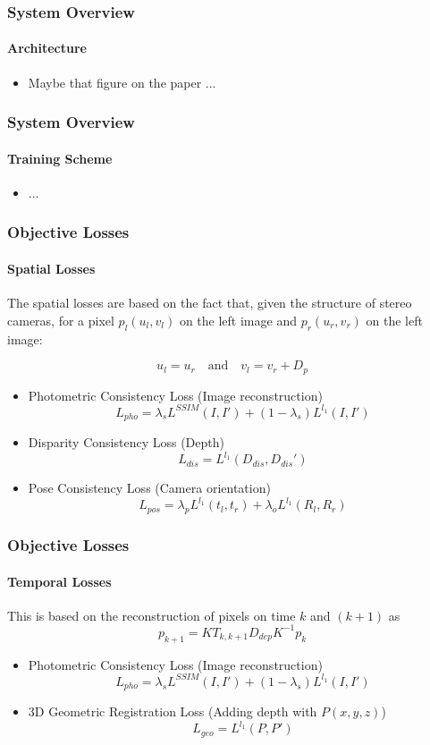 \documentclass{beamer}
\begin{document}
\begin{frame}
	\frametitle{System Overview}
    \framesubtitle{Architecture}
    \begin{itemize}
        \item Maybe that figure on the paper ...
    \end{itemize}
\end{frame}

\begin{frame}
	\frametitle{System Overview}
    \framesubtitle{Training Scheme}
    \begin{itemize}
        \item ...
    \end{itemize}
\end{frame}

\begin{frame}
	\frametitle{Objective Losses}
    \framesubtitle{Spatial Losses}
    The spatial losses are based on the fact that, given the structure of stereo cameras, for a pixel $p_l(u_l, v_l)$ on the left image and $p_r(u_r, v_r)$ on the left image:
    
    \[ u_l = u_r \hspace{1em} \text{and} \hspace{1em} v_l = v_r + D_p \] 
    \begin{itemize}
        \item Photometric Consistency Loss (Image reconstruction)
        \[ L_{pho} = \lambda_s L^{SSIM} (I, I') + (1 - \lambda_s)L^{l_1}(I, I') \]
        
        \item Disparity Consistency Loss (Depth)
        \[ L_{dis} = L^{l_1}(D_{dis}, D_{dis}') \]
        
        \item Pose Consistency Loss (Camera orientation)
        \[ L_{pos} = \lambda_pL^{l_1}(t_l, t_r) + \lambda_oL^{l_1}(R_l, R_r) \]
    \end{itemize}
\end{frame}

\begin{frame}
	\frametitle{Objective Losses}
    \framesubtitle{Temporal Losses}
    This is based on the reconstruction of pixels on time $k$ and $(k + 1)$ as
    \[p_{k + 1} = K T_{k, k+1} D_{dep} K^{-1} p_k \]
    \begin{itemize}
        \item Photometric Consistency Loss (Image reconstruction)
        \[ L_{pho} = \lambda_s L^{SSIM} (I, I') + (1 - \lambda_s)L^{l_1}(I, I') \]
        
        \item 3D Geometric Registration Loss (Adding depth with $P(x, y, z)$)
        \[ L_{geo} = L^{l_1} (P, P') \]
        
    \end{itemize}
\end{frame}
\end{document}
